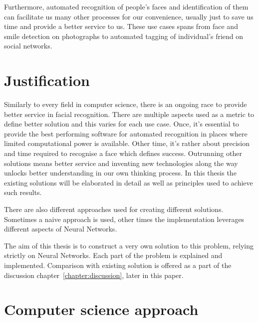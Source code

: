 Furthermore, automated recognition of people's faces and identification of them can facilitate us many other processes for our convenience, usually just to save us time and provide a better service to us. These use cases spans from face and smile detection on photographs to automated tagging of individual's friend on social networks.

\section{Justification}

Similarly to every field in computer science, there is an ongoing race to provide better service in facial recognition. There are multiple aspects used as a metric to define better solution and this varies for each use case. Once, it's essential to provide the best performing software for automated recognition in places where limited computational power is available. Other time, it's rather about precision and time required to recognise a face which defines success. Outrunning other solutions means better service and inventing new technologies along the way unlocks better understanding in our own thinking process. In this thesis the existing solutions will be elaborated in detail as well as principles used to achieve such results.

There are also different approaches used for creating different solutions. Sometimes a naive approach is used, other times the implementation leverages different aspects of Neural Networks. 

The aim of this thesis is to construct a very own solution to this problem, relying strictly on Neural Networks. Each part of the problem is explained and implemented. Comparison with existing solution is offered as a part of the discussion chapter~\ref{chapter:discussion}, later in this paper.

\section{Computer science approach}

